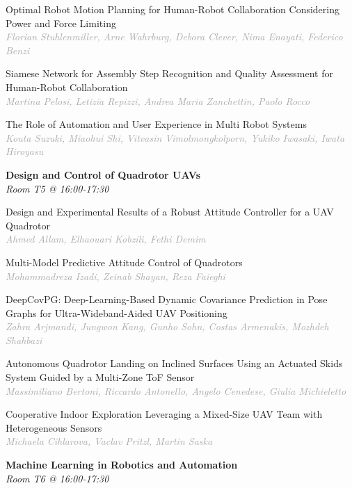 \begin{multicols*}{2}
\small Optimal Robot Motion Planning for Human-Robot Collaboration Considering Power and Force Limiting\\ 
\footnotesize \textcolor{darkgray}{\textit{Florian Stuhlenmiller, Arne  Wahrburg, Debora  Clever, Nima  Enayati, Federico  Benzi}}

\small Siamese Network for Assembly Step Recognition and Quality Assessment for Human-Robot Collaboration\\ 
\footnotesize \textcolor{darkgray}{\textit{Martina Pelosi, Letizia  Repizzi, Andrea Maria  Zanchettin, Paolo  Rocco}}

\small The Role of Automation and User Experience in Multi Robot Systems\\ 
\footnotesize \textcolor{darkgray}{\textit{Kouta Suzuki, Miaohui  Shi, Vitvasin  Vimolmongkolporn, Yukiko  Iwasaki, Iwata  Hiroyasu}}

\normalsize \textbf{Design and Control of Quadrotor UAVs}\\
\small \textit{Room T5 @ 16:00-17:30}

\small Design and Experimental Results of a Robust Attitude Controller for a UAV Quadrotor\\ 
\footnotesize \textcolor{darkgray}{\textit{Ahmed Allam, Elhaouari  Kobzili, Fethi  Demim}}

\small Multi-Model Predictive Attitude Control of Quadrotors\\ 
\footnotesize \textcolor{darkgray}{\textit{Mohammadreza Izadi, Zeinab  Shayan, Reza  Faieghi}}

\small DeepCovPG: Deep-Learning-Based Dynamic Covariance Prediction in Pose Graphs for Ultra-Wideband-Aided UAV Positioning\\ 
\footnotesize \textcolor{darkgray}{\textit{Zahra Arjmandi, Jungwon  Kang, Gunho  Sohn, Costas  Armenakis, Mozhdeh  Shahbazi}}

\small Autonomous Quadrotor Landing on Inclined Surfaces Using an Actuated Skids System Guided by a Multi-Zone ToF Sensor\\ 
\footnotesize \textcolor{darkgray}{\textit{Massimiliano Bertoni, Riccardo  Antonello, Angelo  Cenedese, Giulia  Michieletto}}

\small Cooperative Indoor Exploration Leveraging a Mixed-Size UAV Team with Heterogeneous Sensors\\ 
\footnotesize \textcolor{darkgray}{\textit{Michaela Cihlarova, Vaclav  Pritzl, Martin  Saska}}

\normalsize \textbf{Machine Learning in Robotics and Automation}\\
\small \textit{Room T6 @ 16:00-17:30}


\end{multicols*}
